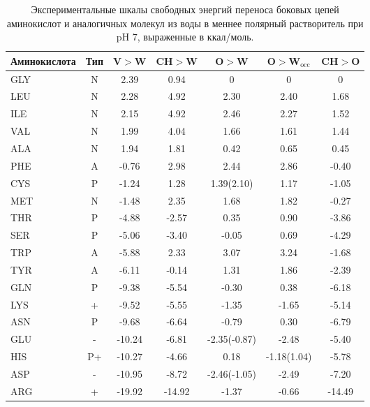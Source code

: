 \begin{table}
\caption{\label{tab:exp_scales} Экспериментальные шкалы свободных энергий переноса боковых цепей аминокислот и аналогичных молекул из воды в меннее полярный растворитель при pH 7, выраженные в ккал/моль.}
\begin{threeparttable}
	\begin{tabular}{lccccc|c}
Аминокислота & Тип\tnote{a} & V$>$W\tnote{b} & CH$>$W\tnote{c} & O$>$W \tnote{d}& O$>$W$_{\text{occ}}$\tnote{e}&CH$>$O\tnote{f} \\
	\hline
GLY  & N & 2.39  &0.94  & 0         & 0&0\\
LEU  & N & 2.28  &4.92  & 2.30      &2.40&1.68\\
ILE  & N & 2.15  &4.92  & 2.46      &2.27&1.52\\
VAL  & N & 1.99  &4.04  & 1.66      &1.61&1.44 \\
ALA  & N & 1.94  &1.81  & 0.42      &0.65&0.45 \\
PHE  & A & -0.76 &2.98  & 2.44      &2.86&-0.40\\
CYS  & P & -1.24 &1.28  & 1.39(2.10)&1.17&-1.05\\
MET  & N & -1.48 &2.35  & 1.68      &1.82&-0.27\\
THR  & P & -4.88 &-2.57 &  0.35     &0.90&-3.86\\
SER  & P & -5.06 &-3.40 &  -0.05    &0.69&-4.29\\
TRP  & A & -5.88 &2.33  & 3.07      &3.24&-1.68\\
TYR  & A & -6.11 &-0.14 &  1.31     &1.86&-2.39\\
GLN  & P & -9.38 &-5.54 & -0.30     &0.38&-6.18\\
LYS  & + & -9.52 &-5.55 &  -1.35    &-1.65&-5.14\\
ASN  & P & -9.68 &-6.64 &  -0.79    &0.30&-6.79\\
GLU  & - & -10.24&-6.81 &  -2.35(-0.87)&-2.48&-5.40\\
HIS  &P+\tnote{g} & -10.27&-4.66 & 0.18&-1.18(1.04)&-5.78\\
ASP  & - & -10.95&-8.72 &  -2.46(-1.05)&-2.49&-7.20\\
ARG  & + & -19.92&-14.92& -1.37&-0.66&-14.49




\end{tabular}
\end{threeparttable}
\end{table}
